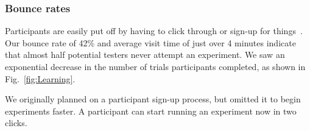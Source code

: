 %


\subsubsection{Bounce rates}
Participants are easily put off by having to click through or sign-up for things~\cite{krug2009don}.  Our bounce rate of 42\% and average visit time of just over 4 minutes indicate that almost half potential testers never attempt an experiment. We saw an exponential decrease in the number of trials participants completed, as shown in Fig.~\ref{fig:Learning}.

We originally planned on a participant sign-up process, but omitted it to begin experiments faster. A participant can start running an experiment now in two clicks.


